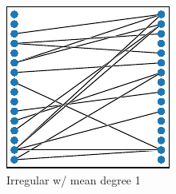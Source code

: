 \begin{figure}
\begin{center}
\begin{minipage}{0.05\textwidth}
\large
{}
\end{minipage}%
\begin{minipage}{0.95\textwidth}
\begin{minipage}{0.05\linewidth}
\large
{}
\end{minipage}%
\begin{minipage}{0.95\linewidth}
\begin{subfigure}[b]{0.5\textwidth}
\centering
\includegraphics[width=\textwidth]{img/graph_layouts/title=irregular-1+ext=}%
\caption{
Irregular w/ mean degree 1
}
\label{fig:irregular_1}
\end{subfigure}
\begin{subfigure}[b]{0.5\textwidth}
\centering

\end{subfigure}
\end{minipage}
\end{minipage}
\end{center}
\end{figure}
